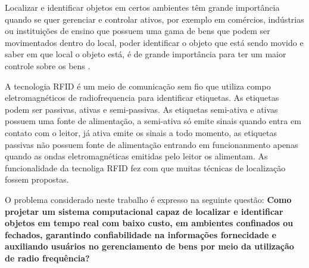 \par
\begin{comment}
Os edifícios e construções dificultam o envio de sinais de rádio emitidos pelos satélites e dispositivos que fazem uso do GPS, 
por essa questão sua utilização torna-se inviável para aplicações que consistem em localizar objetos em ambientes fechados, 
além que o tempo-de-luz transitório fica difícil e caro para fazer sua medição \cite{rfid2009review}.
\end{comment}


Localizar e identificar objetos em certos ambientes têm grande importância quando se quer gerenciar e controlar ativos, 
por exemplo em comércios, indústrias ou instituições de ensino que possuem uma gama de bens que podem ser movimentados dentro do local, 
poder identificar o objeto que está sendo movido e saber em que local o objeto está, é de grande importância para ter um maior 
controle sobre os bens \cite{realtimeRFID2016}. 

A tecnologia RFID é um meio de comunicação sem fio que utiliza compo eletromagnéticos de radiofrequencia para identificar etiquetas. As etiquetas podem ser passivas, ativas e semi-passivas. As etiquetas semi-ativa e ativas possuem uma fonte de alimentação, a semi-ativa só emite sinais quando entra em contato com o leitor, já ativa emite os sinais a todo momento, as etiquetas passivas não possuem fonte de alimentação entrando em funcionanmento apenas quando as ondas eletromagnéticas emitidas pelo leitor os alimentam\cite{realtimeRFID2016}. As funcionalidade da tecnoliga RFID fez com que muitas técnicas de localização fossem propostas.

\begin{comment}
\par
Muitas técnicas de localização baseadas em RFID foram propostas, sendo com foco em objetos móveis ou estacionários, contudo algumas dessas técnicas fazem uso de etiquetas ativas a fim de obter melhores estimativas,
\end{comment}
\par
O problema considerado neste trabalho é expresso na seguinte questão: 
\textbf{Como projetar um sistema computacional capaz de localizar e identificar objetos em tempo real com baixo custo, em ambientes confinados ou fechados, garantindo confiabilidade na informações fornecidade e auxiliando usuários no gerenciamento de bens por meio da utilização de radio frequência?}

